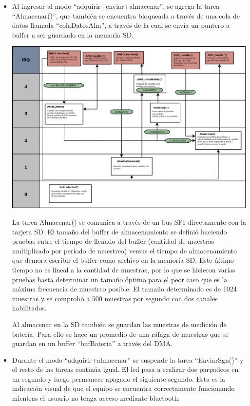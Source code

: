 \begin{itemize}
	\item Al ingresar al modo “adquirir+enviar+almacenar”, se agrega la tarea “Almacenar()”, que también se encuentra bloqueada a través de una cola de datos llamada “colaDatosAlm”, a través de la cual se envía un puntero a buffer a ser guardado en la memoria SD. 
	
\begin{adjustbox}{center,caption={Diagrama de tareas en modo adquirir, enviar y almacenar},label={fig:VOP24_tareas_v1_adquirirEnviarAlmacenar},nofloat=figure,vspace=\bigskipamount}
\includegraphics[angle= 90, scale = 0.20]{./Figures/VOP24_tareas_v1_adquirirEnviarAlmacenar.png}
\end{adjustbox}
	
	La tarea Almacenar() se comunica a través de un bus SPI directamente con la tarjeta SD. El tamaño del buffer de almacenamiento se definió haciendo pruebas entre el tiempo de llenado del buffer (cantidad de muestras multiplicado por período de muestreo) versus el tiempo de almacenamiento que demora escribir el buffer como archivo en la memoria SD. Este último tiempo no es lineal a la cantidad de muestras, por lo que se hicieron varias pruebas hasta determinar un tamaño óptimo para el peor caso que es la máxima frecuencia de muestreo posible. El tamaño determinado es de 1024 muestras y se comprobó a 500 muestras por segundo con dos canales habilitados. 
	
Al almacenar en la SD también se guardan las muestras de medición de batería. Para ello se hace un promedio de una ráfaga de muestras que se guardan en un buffer “bufBateria” a través del DMA.

	\item Durante el modo “adquirir+almacenar” se suspende la tarea “EnviarSgn()” y el resto de las tareas continúa igual. El led pasa a realizar dos parpadeos en un segundo y luego permanece apagado el siguiente segundo. Esta es la indicación visual de que el equipo se encuentra correctamente funcionando mientras el usuario no tenga acceso mediante bluetooth.



\end{itemize}
